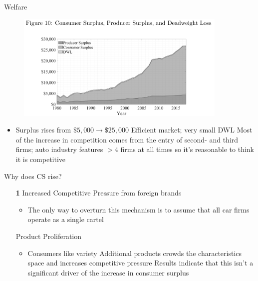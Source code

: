 \documentclass{beamer}
\begin{document}
%
\begin{frame}{Welfare}
    \begin{figure}[htp]
      \centering
    \includegraphics[width=0.9\textwidth, keepaspectratio=true]{fig10.png}
    \end{figure}
  \begin{itemize}
  \item Surplus rises from $\$5,000\to \$25,000$
    \vitem Efficient market; very small DWL
    \vitem Most of the increase in competition comes from the entry of second- and third firms; auto industry features $>4$ firms at all times so it's reasonable to think it is competitive
  \end{itemize}
\end{frame}
%
\begin{frame}{Why does CS rise?}
  \begin{itemize}
  \item[\textbf{1}] Increased Competitive Pressure from foreign brands
    \begin{itemize}
    \item The only way to overturn this mechanism is to assume that all car firms operate as a single cartel
    \end{itemize}
  \vitem[\textbf{2}] Product Proliferation
    \begin{itemize}
    \item Consumers like variety
      \vitem Additional products crowds the characteristics space and increases competitive pressure
      \vitem Results indicate that this isn't a significant driver of the increase in consumer surplus
    \end{itemize}
  \end{itemize}
\end{frame}
%
\end{document}
